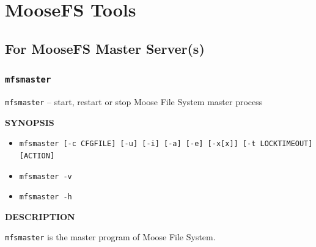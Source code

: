 \documentclass[a4paper,11pt,english]{report}
\def\code#1{\texttt{#1}}
\begin{document}
	\chapter{MooseFS Tools}
	
		\section{For MooseFS Master Server(s)}
		
			\subsection{\code{mfsmaster}}
				\code{mfsmaster} -- start, restart or stop Moose File System master process
				\bigskip
				
				\textbf{SYNOPSIS}
				\begin{itemize}
					\item \code{mfsmaster [-c CFGFILE] [-u] [-i] [-a] [-e] [-x[x]] [-t LOCKTIMEOUT] [ACTION]}
					\item \code{mfsmaster -v}
					\item \code{mfsmaster -h}
				\end{itemize}
				
				\bigskip
				\textbf{DESCRIPTION}
				
				\code{mfsmaster} is the master program of Moose File System.
				
				\bigskip
				
\end{document}

